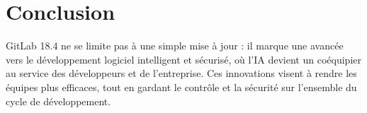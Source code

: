 \documentclass[12pt,a4paper]{article}
\begin{document}
\section*{Conclusion}
GitLab 18.4 ne se limite pas à une simple mise à jour : il marque une avancée vers le développement logiciel intelligent et sécurisé, où l’IA devient un coéquipier au service des développeurs et de l’entreprise. Ces innovations visent à rendre les équipes plus efficaces, tout en gardant le contrôle et la sécurité sur l’ensemble du cycle de développement.
\end{document}
